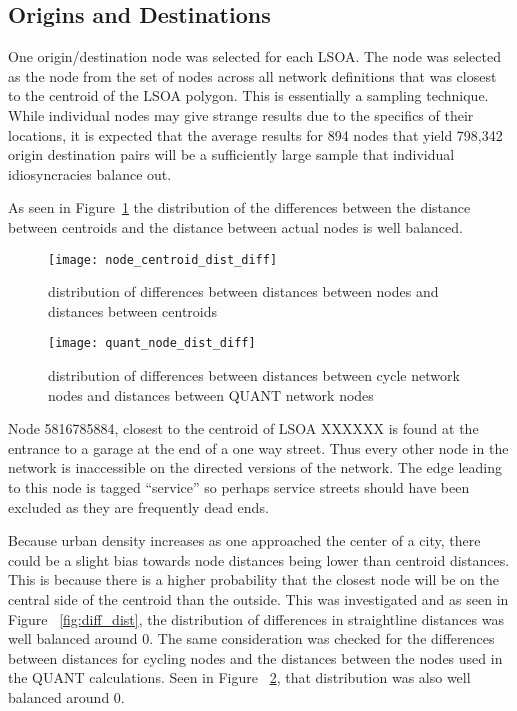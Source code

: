 \subsection{Origins and Destinations}

One origin/destination node was selected for each LSOA. The node was selected as the node from the set of nodes across all network definitions that was closest to the centroid of the LSOA polygon. This is essentially a sampling technique. While individual nodes may give strange results due to the specifics of their locations, it is expected that the average results for 894 nodes that yield 798,342 origin destination pairs will be a sufficiently large sample that individual idiosyncracies balance out. 

As seen in Figure~\ref{fig:dist_diffs} the distribution of the differences between the distance between centroids and the distance between actual nodes is well balanced. 

\begin{figure}
\centering
\texttt{[image: node\_centroid\_dist\_diff]}
\caption{distribution of differences between distances between nodes and distances between centroids}
\label{fig:dist_diffs}
\end{figure}

\begin{figure}
\centering
\texttt{[image: quant\_node\_dist\_diff]}
\caption{distribution of differences between distances between cycle network nodes and distances between QUANT network nodes}
\label{fig:quant_dist_diffs}
\end{figure}

Node 5816785884, closest to the centroid of LSOA XXXXXX is found at the entrance to a garage at the end of a one way street. Thus every other node in the network is inaccessible on the directed versions of the network. The edge leading to this node is tagged ``service'' so perhaps service streets should have been excluded as they are frequently dead ends. 

Because urban density increases as one approached the center of a city, there could be a slight bias towards node distances being lower than centroid distances. This is because there is a higher probability that the closest node will be on the central side of the centroid than the outside. This was investigated and as seen in Figure ~\ref{fig:diff_dist}, the distribution of differences in straightline distances was well balanced around 0. The same consideration was checked for the differences between distances for cycling nodes and the distances between the nodes used in the QUANT calculations. Seen in Figure ~\ref{fig:quant_dist_diffs}, that distribution was also well balanced around 0. 




